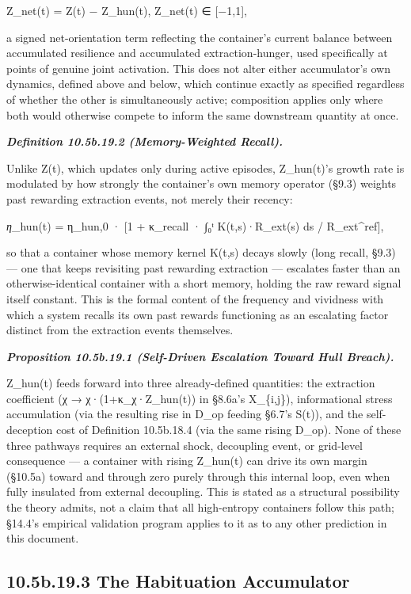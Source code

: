 \documentclass[
]{article}
\begin{document}
Z\_net(t) = Z(t) − Z\_hun(t), Z\_net(t) ∈ {[}−1,1{]},

a signed net-orientation term reflecting the container's current balance
between accumulated resilience and accumulated extraction-hunger, used
specifically at points of genuine joint activation. This does not alter
either accumulator's own dynamics, defined above and below, which
continue exactly as specified regardless of whether the other is
simultaneously active; composition applies only where both would
otherwise compete to inform the same downstream quantity at once.

\emph{\textbf{Definition 10.5b.19.2 (Memory-Weighted Recall).}}

Unlike Z(t), which updates only during active episodes, Z\_hun(t)'s
growth rate is modulated by how strongly the container's own memory
operator (§9.3) weights past rewarding extraction events, not merely
their recency:

\emph{η}\_hun(t) = η\_hun,0 · {[}1 + κ\_recall · ∫₀ᵗ K(t,s)·R\_ext(s) ds
/ R\_ext\^{}ref{]},

so that a container whose memory kernel K(t,s) decays slowly (long
recall, §9.3) --- one that keeps revisiting past rewarding extraction
--- escalates faster than an otherwise-identical container with a short
memory, holding the raw reward signal itself constant. This is the
formal content of the frequency and vividness with which a system
recalls its own past rewards functioning as an escalating factor
distinct from the extraction events themselves.

\emph{\textbf{Proposition 10.5b.19.1 (Self-Driven Escalation Toward Hull
Breach).}}

Z\_hun(t) feeds forward into three already-defined quantities: the
extraction coefficient (χ → χ·(1+κ\_χ·Z\_hun(t)) in §8.6a's X\_\{i,j\}),
informational stress accumulation (via the resulting rise in D\_op
feeding §6.7's S(t)), and the self-deception cost of Definition
10.5b.18.4 (via the same rising D\_op). None of these three pathways
requires an external shock, decoupling event, or grid-level consequence
--- a container with rising Z\_hun(t) can drive its own margin (§10.5a)
toward and through zero purely through this internal loop, even when
fully insulated from external decoupling. This is stated as a structural
possibility the theory admits, not a claim that all high-entropy
containers follow this path; §14.4's empirical validation program
applies to it as to any other prediction in this document.

\hypertarget{b.19.3-the-habituation-accumulator}{%
\subsection{10.5b.19.3 The Habituation
Accumulator}\label{b.19.3-the-habituation-accumulator}}
\end{document}
